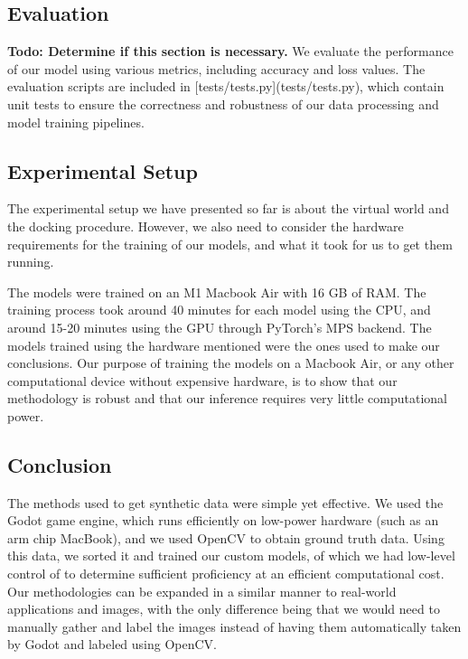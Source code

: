 \subsection{Evaluation}
\textbf{Todo: Determine if this section is necessary.}
We evaluate the performance of our model using various metrics, including accuracy and loss values. The evaluation scripts are included in [tests/tests.py](tests/tests.py), which contain unit tests to ensure the correctness and robustness of our data processing and model training pipelines.

\subsection{Experimental Setup}
The experimental setup we have presented so far is about the virtual world and the docking procedure. However, we also need to consider the hardware requirements for the training of our models, and what it took for us to get them running.

The models were trained on an M1 Macbook Air with 16 GB of RAM. The training process took around 40 minutes for each model using the CPU, and around 15-20 minutes using the GPU through PyTorch's MPS backend. The models trained using the hardware mentioned were the ones used to make our conclusions. Our purpose of training the models on a Macbook Air, or any other computational device without expensive hardware, is to show that our methodology is robust and that our inference requires very little computational power.

\subsection{Conclusion}
The methods used to get synthetic data were simple yet effective. We used the Godot game engine, which runs efficiently on low-power hardware (such as an arm chip MacBook), and we used OpenCV to obtain ground truth data. Using this data, we sorted it and trained our custom models, of which we had low-level control of to determine sufficient proficiency at an efficient computational cost. Our methodologies can be expanded in a similar manner to real-world applications and images, with the only difference being that we would need to manually gather and label the images instead of having them automatically taken by Godot and labeled using OpenCV.
